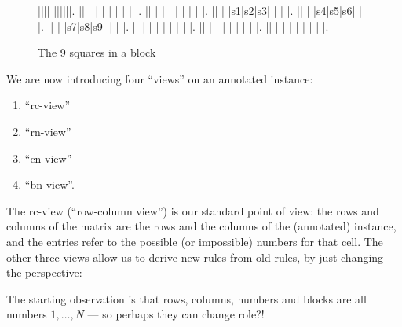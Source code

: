 \documentclass[11pt]{report}
\begin{document}
\begin{figure}[htbp]
\begin{sudoku}
 |{}|{}|{}| {}|{}|{}|{}|{}|{}|.
 |{}| | | | | | | | |.
 |{}| | | | | | | | |.
 |{}| | |{\LARGE s1}|{\LARGE s2}|{\LARGE s3}| | | |.
 |{}| | |{\LARGE s4}|{\LARGE s5}|{\LARGE s6}| | | |.
 |{}| | |{\LARGE s7}|{\LARGE s8}|{\LARGE s9}| | | |.
 |{}| | | | | | | | |.
 |{}| | | | | | | | |.
 |{}| | | | | | | | |.
\end{sudoku}
\caption{The 9 squares in a block}
\label{fig:squres}
\end{figure}

We are now introducing four ``views'' on an annotated instance:
\begin{enumerate}
\item ``rc-view''
\item ``rn-view''
\item ``cn-view''
\item ``bn-view''.
\end{enumerate}
The rc-view (``row-column view'') is our standard point of view: the rows and columns of the matrix are the rows and the columns of the (annotated) instance, and the entries refer to the possible (or impossible) numbers for that cell. The other three views allow us to derive new rules from old rules, by just changing the perspective:
\begin{center}
The starting observation is that rows, columns, numbers and blocks are all numbers $1,\dots,N$ --- so perhaps they can change role?!
\end{center}
\end{document}
